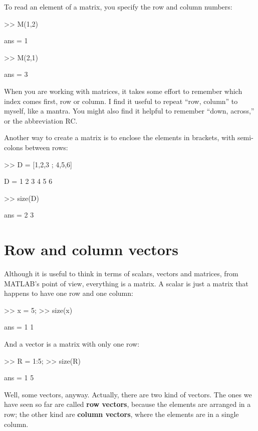 To read an element of a matrix, you specify the row and column numbers:

\begin{code}
>> M(1,2)

ans = 1

>> M(2,1)

ans = 3
\end{code}

When you are working with matrices, it takes some effort to remember
which index comes first, row or column.  I find it useful to repeat
``row, column'' to myself, like a mantra.  You might also find it
helpful to remember ``down, across,'' or the abbreviation RC.

Another way to create a matrix is to enclose the elements in
brackets, with semi-colons between rows:

\begin{code}
>> D = [1,2,3 ; 4,5,6]

D =  1     2     3
     4     5     6

>> size(D)

ans = 2     3
\end{code}



\section{Row and column vectors}
\label{rowvector}


Although it is useful to think in terms of scalars, vectors and matrices,
from MATLAB's point of view, everything is a matrix.  A scalar
is just a matrix that happens to have one row and one column:

\begin{code}
>> x = 5;
>> size(x)

ans = 1     1
\end{code}

And a vector is a matrix with only one row:

\begin{code}
>> R = 1:5;
>> size(R)

ans = 1     5
\end{code}

Well, some vectors, anyway.  Actually, there are two kind
of vectors.  The ones we have seen so far are called {\bf row vectors},
because the elements are arranged in a row; the other kind are
{\bf column vectors}, where the elements are in a single column.


